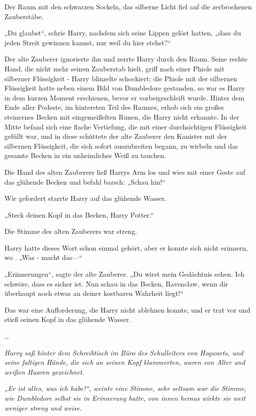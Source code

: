 {Der Raum mit den schwarzen Sockeln, das silberne Licht fiel auf die zerbrochenen Zauberstäbe.

„Du glaubst“, schrie Harry, nachdem sich seine Lippen gelöst hatten, „dass du jeden Streit gewinnen kannst, nur weil du hier stehst?“

Der alte Zauberer ignorierte ihn und zerrte Harry durch den Raum. Seine rechte Hand, die nicht mehr seinen Zauberstab hielt, griff nach einer Phiole mit silberner Flüssigkeit - Harry blinzelte schockiert; die Phiole mit der silbernen Flüssigkeit hatte neben einem Bild von Dumbledore gestanden, so war es Harry in dem kurzen Moment erschienen, bevor er vorbeigeschleift wurde. Hinter dem Ende aller Podeste, im hintersten Teil des Raumes, erhob sich ein großes steinernes Becken mit eingemeißelten Runen, die Harry nicht erkannte. In der Mitte befand sich eine flache Vertiefung, die mit einer durchsichtigen Flüssigkeit gefüllt war, und in diese schüttete der alte Zauberer den Kanister mit der silbernen Flüssigkeit, die sich sofort auszubreiten begann, zu wirbeln und das gesamte Becken in ein unheimliches Weiß zu tauchen.

Die Hand des alten Zauberers ließ Harrys Arm los und wies mit einer Geste auf das glühende Becken und befahl barsch: „Schau hin!“

Wie gefordert starrte Harry auf das glühende Wasser.

„Steck deinen Kopf in das Becken, Harry Potter.“

Die Stimme des alten Zauberers war streng.

Harry hatte dieses Wort schon einmal gehört, aber er konnte sich nicht erinnern, wo . „Was - macht das—“

„Erinnerungen“, sagte der alte Zauberer. „Du wirst mein Gedächtnis sehen. Ich schwöre, dass es sicher ist. Nun schau in das Becken, Ravenclaw, wenn dir überhaupt noch etwas an deiner kostbaren Wahrheit liegt!“

Das war eine Aufforderung, die Harry nicht ablehnen konnte, und er trat vor und stieß seinen Kopf in das glühende Wasser.

…

\emph{Harry saß hinter dem Schreibtisch im Büro des Schulleiters von Hogwarts, und seine faltigen Hände, die sich an seinen Kopf klammerten, waren von Alter und weißen Haaren gezeichnet.}

\emph{„Er ist alles, was ich habe!“, weinte eine Stimme, sehr seltsam war die Stimme, wie Dumbledore selbst sie in Erinnerung hatte, von innen heraus wirkte sie weit weniger streng und weise.}

}

